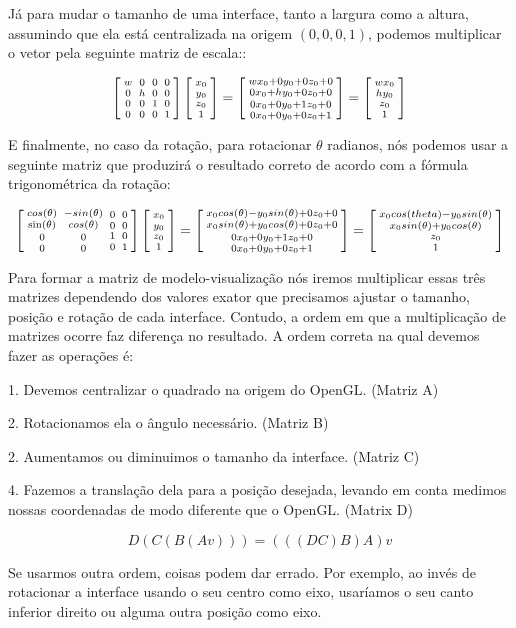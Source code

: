 Já para mudar o tamanho de uma interface, tanto a largura como a
altura, assumindo que ela está centralizada na origem $(0, 0, 0, 1)$,
podemos multiplicar o vetor pela seguinte matriz de escala::

$$ \left[{{w \atop 0}\atop {0\atop 0}}{{0 \atop h}\atop {0 \atop
      0}}{{0\atop 0}\atop{1 \atop 0}}{{0 \atop 0}\atop{0\atop
      1}}\right]\left[{{x_0\atop y_0}\atop {z_0\atop
      1}}\right]=\left[{{wx_0+0y_0+0z_0+0\atop 0x_0+hy_0+0z_0+0}\atop
    {0x_0+0y_0+1z_0+0\atop 0x_0+0y_0+0z_0+1}}\right]=\left[{{wx_0\atop
      hy_0}\atop {z_0\atop 1}}\right]
$$

E finalmente, no caso da rotação, para rotacionar $\theta$ radianos,
nós podemos usar a seguinte matriz que produzirá o resultado correto
de acordo com a fórmula trigonométrica da rotação:

$$ \left[{{cos(\theta) \atop \sin(\theta)}\atop {0\atop
      0}}{{-sin(\theta) \atop cos(\theta)}\atop {0 \atop 0}}{{0\atop
      0}\atop{1 \atop 0}}{{0 \atop 0}\atop{0\atop
      1}}\right]\left[{{x_0\atop y_0}\atop {z_0\atop
      1}}\right]=\left[{{x_0 cos(\theta)-y_0 sin(\theta)+0z_0+0\atop
      x_0 sin(\theta)+y_0 cos(\theta)+0z_0+0}\atop
    {0x_0+0y_0+1z_0+0\atop 0x_0+0y_0+0z_0+1}}\right]=\left[{{x_0
      cos(theta) - y_0 sin(\theta) \atop x_0 sin(\theta) + y_0
      cos(\theta)}\atop {z_0\atop 1}}\right]
$$

Para formar a matriz de modelo-visualização nós iremos multiplicar
essas três matrizes dependendo dos valores exator que precisamos
ajustar o tamanho, posição e rotação de cada interface. Contudo, a
ordem em que a multiplicação de matrizes ocorre faz diferença no
resultado. A ordem correta na qual devemos fazer as operações é:

1. Devemos centralizar o quadrado na origem do OpenGL. (Matriz A)

2. Rotacionamos ela o ângulo necessário. (Matriz B)

2. Aumentamos ou diminuimos o tamanho da interface. (Matriz C)

4. Fazemos a translação dela para a posição desejada, levando em conta
 medimos nossas coordenadas de modo diferente que o OpenGL. (Matrix D)

$$
D(C(B(A v))) = (((DC)B)A)v
$$

Se usarmos outra ordem, coisas podem dar errado. Por exemplo, ao invés
de rotacionar a interface usando o seu centro como eixo, usaríamos o
seu canto inferior direito ou alguma outra posição como eixo.

